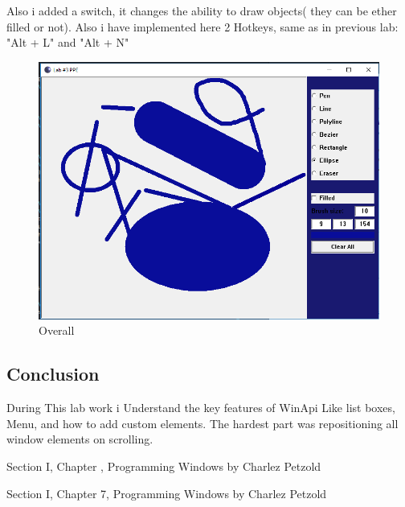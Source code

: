 \documentclass[12pt]{article}
\begin{document}
        \vspace{0.5 cm}
       Also i added a switch, it changes the ability to draw objects( they can be ether filled or not). Also i have implemented here 2 Hotkeys, same as in previous lab: "Alt + L" and "Alt + N"
       \begin{figure}[H]
        \centering
        \includegraphics[width=.9\textwidth]{img9.png}
        \caption{Overall}
        \end{figure}
   
        \newpage
        \subsection*{Conclusion}
        During This lab work i Understand the key features of WinApi Like list boxes, Menu, and how to add custom elements. The hardest part was repositioning all window elements on scrolling.
        

 
\medskip
 
\begin{thebibliography}{9}

        Section I, Chapter , Programming Windows by Charlez Petzold

        Section I, Chapter 7, Programming Windows by Charlez Petzold

\end{thebibliography}
                
\end{document}
